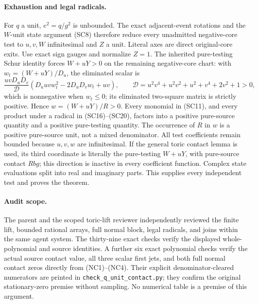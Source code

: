 \paragraph{Exhaustion and legal radicals.}
For $q$ a unit, $e^2=q/g^2$ is unbounded. The exact adjacent-event
rotations and the $W$-unit state argument (SC8) therefore reduce every
unadmitted negative-core test to $u,v,W$ infinitesimal and $Z$ a unit.
Literal axes are direct original-core exits. Use exact sign gauges and
normalize $Z=1$. The inherited pure-testing Schur identity forces
$W+uY>0$ on the remaining negative-core chart: with
$w_t=(W+uY)/D_u$, the eliminated scalar is
\[
 \frac{uvD_uD_v}{\mathcal D}
       (D_uuv w_t^2-2D_uD_vw_t+uv),\qquad
 \mathcal D=u^2v^4+u^2v^2+u^2+v^4+2v^2+1>0,
\]
which is nonnegative when $w_t\le0$; its eliminated two-square
matrix is strictly positive. Hence $w=(W+uY)/R>0$.
Every monomial in (SC11), and every product under a radical in
(SC16)--(SC20), factors into a positive pure-source quantity and a
positive pure-testing quantity. The occurrence of $R$ in $w$ is a
positive pure-source unit, not a mixed denominator. All test
coefficients remain bounded because $u,v,w$ are infinitesimal.
If the general toric contact lemma is used, its third coordinate
is literally the pure-testing $W+uY$, with pure-source contact
$Rbg$; this direction is inactive in every coefficient function.
Complex state evaluations split into real and imaginary parts.
This supplies every independent test and proves the theorem.

\paragraph{Audit scope.}
The parent and the scoped toric-lift reviewer independently reviewed
the finite lift, bounded rational arrays, full normal block, legal
radicals, and joins within the same agent system. The thirty-nine
exact checks verify the displayed whole-polynomial and source
identities. A further six exact polynomial checks verify the actual
source contact value, all three scalar first jets, and both full
normal contact zeros directly from (NC1)--(NC4). Their explicit
denominator-cleared numerators are printed in
\texttt{check\_q\_unit\_contact.py}; they confirm the original
stationary-zero premise without sampling. No numerical table is a
premise of this argument.
